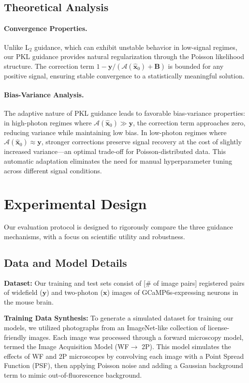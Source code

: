 \documentclass{article}
\newcommand{\wf}{WF\xspace}
\newcommand{\twop}{2P\xspace}
\begin{document}
\subsection{Theoretical Analysis}

\paragraph{Convergence Properties.} Unlike L$_2$ guidance, which can exhibit unstable behavior in low-signal regimes, our PKL guidance provides natural regularization through the Poisson likelihood structure. The correction term $1 - \mathbf{y}/(\mathcal{A}(\mathbf{\hat{x}}_0) + \mathbf{B})$ is bounded for any positive signal, ensuring stable convergence to a statistically meaningful solution.

\paragraph{Bias-Variance Analysis.} The adaptive nature of PKL guidance leads to favorable bias-variance properties: in high-photon regimes where $\mathcal{A}(\mathbf{\hat{x}}_0) \gg \mathbf{y}$, the correction term approaches zero, reducing variance while maintaining low bias. In low-photon regimes where $\mathcal{A}(\mathbf{\hat{x}}_0) \approx \mathbf{y}$, stronger corrections preserve signal recovery at the cost of slightly increased variance—an optimal trade-off for Poisson-distributed data. This automatic adaptation eliminates the need for manual hyperparameter tuning across different signal conditions.

\section{Experimental Design}
\label{sec:experiments}
Our evaluation protocol is designed to rigorously compare the three guidance mechanisms, with a focus on scientific utility and robustness.

\subsection{Data and Model Details}
\textbf{Dataset:} Our training and test sets consist of [{\# of image pairs}] registered pairs of widefield ($\mathbf{y}$) and two-photon ($\mathbf{x}$) images of GCaMP6s-expressing neurons in the mouse brain.

\textbf{Training Data Synthesis:} To generate a simulated dataset for training our models, we utilized photographs from an ImageNet-like collection of license-friendly images. Each image was processed through a forward microscopy model, termed the Image Acquisition Model (\wf $\rightarrow$ \twop). This model simulates the effects of \wf and \twop microscopes by convolving each image with a Point Spread Function (PSF), then applying Poisson noise and adding a Gaussian background term to mimic out-of-fluorescence background.
\end{document}
